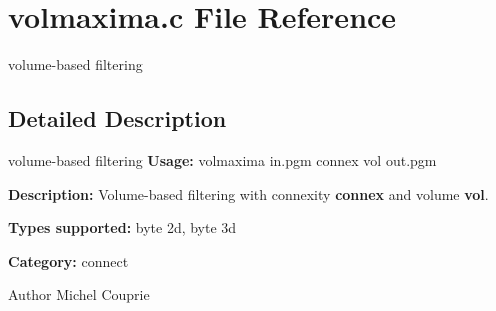 \section{volmaxima.c File Reference}
\label{volmaxima_8c}


volume-\/based filtering  




\subsection{Detailed Description}
volume-\/based filtering {\bfseries Usage:} volmaxima in.pgm connex vol out.pgm

{\bfseries Description:} Volume-\/based filtering with connexity {\bfseries connex} and volume {\bfseries vol}.

{\bfseries Types supported:} byte 2d, byte 3d

{\bfseries Category:} connect

\begin{DoxyAuthor}{Author}
Michel Couprie 
\end{DoxyAuthor}
